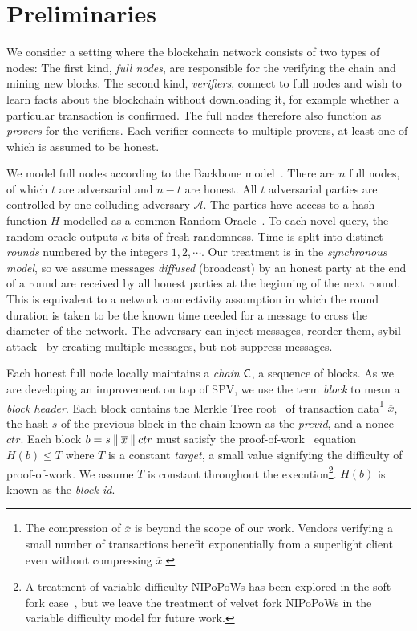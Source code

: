 \section{Preliminaries}\label{sec:preliminaries}

We consider a setting where the blockchain network consists of two
types of nodes: The first kind, \emph{full nodes}, are responsible for the
verifying the chain and mining new blocks. The
second kind, \emph{verifiers}, connect to full nodes and wish to learn facts
about the blockchain without downloading it, for example whether a particular
transaction is confirmed. The full nodes therefore also function as
\emph{provers} for the verifiers. Each verifier connects to multiple provers, at
least one of which is assumed to be honest.

We model full nodes according to the Backbone model~\cite{backbone}. There are
$n$ full nodes, of which $t$ are adversarial and $n - t$ are honest. All $t$
adversarial parties are controlled by one colluding adversary $\mathcal{A}$. The
parties have access to a hash function $H$ modelled as a common Random
Oracle~\cite{ro}. To each novel query, the random oracle outputs $\kappa$ bits
of fresh randomness. Time is split into distinct \emph{rounds} numbered by the
integers $1, 2, \cdots$. Our treatment is in the \emph{synchronous model}, so we
assume messages \emph{diffused} (broadcast) by an honest party at the end of a
round are received by all honest parties at the beginning of the next round.
This is equivalent to a network connectivity assumption in which the round
duration is taken to be the known time needed for a message to cross the
diameter of the network. The adversary can inject messages, reorder them, sybil
attack~\cite{sybil} by creating multiple messages, but not suppress messages.

Each honest full node locally maintains a \emph{chain} $\mathsf{C}$, a sequence of
blocks. As we are developing an improvement on top of SPV, we
use the term \emph{block} to mean a
\emph{block header}. Each block contains the Merkle Tree root~\cite{merkle} of
transaction data\footnote{The compression of
$\overline{x}$ is beyond the scope of our work. Vendors verifying a small number
of transactions benefit exponentially from a superlight client even without
compressing $\overline{x}$.}
$\overline{x}$, the hash $s$ of the previous block in the chain
known as the \emph{previd}, and a nonce $ctr$. Each block $b = s \mathbin{\|}
\overline{x} \mathbin{\|} ctr$ must satisfy the proof-of-work~\cite{pow} equation $H(b) \leq T$
where $T$ is a constant \emph{target}, a small value signifying the difficulty
of proof-of-work. We assume $T$ is constant throughout the execution\footnote{A
treatment of variable difficulty NIPoPoWs has been explored in the soft fork
case~\cite{dionyziz}, but we leave the treatment of velvet fork NIPoPoWs in the
variable difficulty model for future work.}. $H(b)$ is
known as the \emph{block id}.

